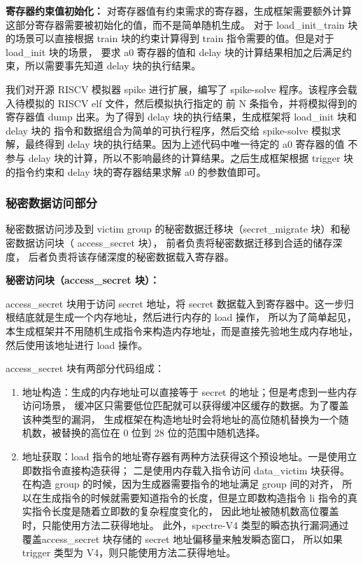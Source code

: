 \textbf{寄存器约束值初始化：}
对寄存器值有约束需求的寄存器，生成框架需要额外计算这部分寄存器需要被初始化的值，而不是简单随机生成。
对于 load\_init\_train 块的场景可以直接根据 train 块的约束计算得到 train 指令需要的值。但是对于 load\_init 块的场景，
要求 a0 寄存器的值和 delay 块的计算结果相加之后满足约束，所以需要事先知道 delay 块的执行结果。\par

我们对开源 RISCV 模拟器 spike 进行扩展，编写了 spike-solve 程序。该程序会载入待模拟的 RISCV elf 文件，然后模拟执行指定的
前 N 条指令，并将模拟得到的寄存器值 dump 出来。为了得到 delay 块的执行结果，生成框架将 load\_init 块和 delay 块的
指令和数据组合为简单的可执行程序，然后交给 spike-solve 模拟求解，最终得到 delay 块的执行结果。因为上述代码中唯一待定的 a0 寄存器的值
不参与 delay 块的计算，所以不影响最终的计算结果。之后生成框架根据 trigger 块的指令约束和 delay 块的寄存器结果求解 a0 的参数值即可。

\subsubsection{秘密数据访问部分}

秘密数据访问涉及到 victim group 的秘密数据迁移块（secret\_migrate 块）和秘密数据访问块（ access\_secret 块），
前者负责将秘密数据迁移到合适的储存深度，
后者负责将该存储深度的秘密数据载入寄存器。\par

\textbf{秘密访问块（access\_secret 块）：}\par
access\_secret 块用于访问 secret 地址，将 secret 数据载入到寄存器中。这一步归根结底就是生成一个内存地址，然后进行内存的 load 操作，
所以为了简单起见，本生成框架并不用随机生成指令来构造内存地址，而是直接先验地生成内存地址，然后使用该地址进行 load 操作。\par

access\_secret 块有两部分代码组成：
\begin{enumerate}
    \item 地址构造：生成的内存地址可以直接等于 secret 的地址；但是考虑到一些内存访问场景，
缓冲区只需要低位匹配就可以获得缓冲区缓存的数据。为了覆盖该种类型的漏洞，
生成框架在构造地址时会将地址的高位随机替换为一个随机数，被替换的高位在 0 位到 28 位的范围中随机选择。\par
    \item 地址获取：load 指令的地址寄存器有两种方法获得这个预设地址。一是使用立即数指令直接构造获得；
二是使用内存载入指令访问 data\_victim 块获得。在构造 group 的时候，因为生成器需要指令的地址满足 group 间的对齐，
所以在生成指令的时候就需要知道指令的长度，但是立即数构造指令 li 指令的真实指令长度是随着立即数的复杂程度变化的，
因此地址被随机数高位覆盖时，只能使用方法二获得地址。
此外，spectre-V4 类型的瞬态执行漏洞通过覆盖access\_secret 块存储的 secret 地址偏移量来触发瞬态窗口，
所以如果 trigger 类型为 V4，则只能使用方法二获得地址。\par
\end{enumerate}

